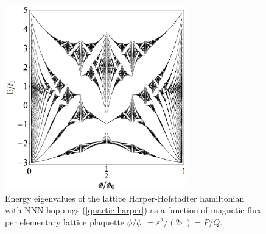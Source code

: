 \documentclass[aps,prb,twocolumn,letterpaper,twoside,nobalancelastpage,groupedaddress,amsmath,amssymb,floatfix,citeautoscript]{revtex4-1}
\begin{document}
\begin{figure}[thb]
\centering
\hspace{-0.25in}\includegraphics[width=3.1in]{q-butterfly-raster-1200.pdf}
\caption{\label{butterfly-plot} Energy eigenvalues of the lattice Harper-Hofstadter hamiltonian with NNN hoppings (\ref{quartic-harper}) as a function of magnetic flux per elementary lattice plaquette $\phi/\phi_0 = \varepsilon^2/(2\pi) = P/Q$.}
\end{figure}

\end{document}
